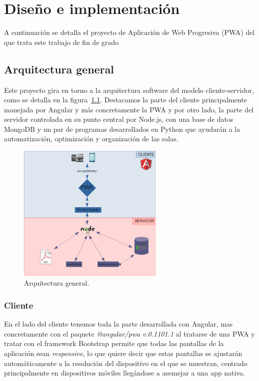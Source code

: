 \documentclass[a4paper, 12pt]{book}
\begin{document}
\chapter{Diseño e implementación}

A continuación se detalla el proyecto de Aplicación de Web Progresiva (PWA) del que trata este trabajo de fin de grado

\section{Arquitectura general} 
\label{sec:arquitectura}
Este proyecto gira en torno a la arquitectura software del modelo cliente-servidor, como se detalla en la figura~\ref{fig:arquitectura}. Destacamos la parte del cliente principalmente manejada por Angular y más concretamente la PWA y por otro lado, la parte del servidor controlada en su punto central por Node.js, con una base de datos MongoDB y un par de programas desarrollados en Python que ayudarán a la automatización, optimización y organización de las salas.
\begin{figure}[h!]
  \centering
  \includegraphics[width=7cm, keepaspectratio]{img/arquitectura.png}
  \caption{Arquitectura general.}\label{fig:arquitectura}
\end{figure}

 
\subsection{Cliente}
	En el lado del cliente tenemos toda la parte desarrollada con Angular, mas concretamente con el paquete \textit{@angular/pwa v.0.1101.1} al tratarse de una PWA y tratar con el framework Bootstrap permite que todas las pantallas de la aplicación sean \textit{responsive}, lo que quiere decir que estas pantallas se ajustarán automáticamente a la resolución del dispositivo en el que se muestran, centrado principalmente en dispositivos móviles llegándose a asemejar a una app nativa.
	
\end{document}
